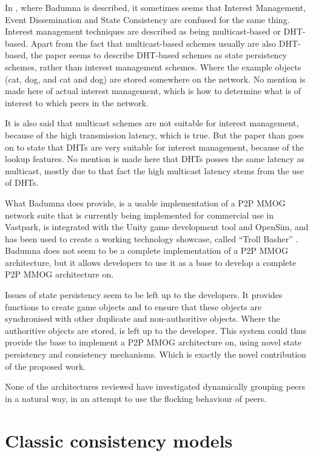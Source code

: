\documentclass[journal,oneside,a4paper,onecolumn]{IEEEtran}
\begin{document}
In \cite{badumna_engine}, where Badumna is described, it sometimes seems that Interest Management, Event Dissemination and State Consistency are confused for the same thing. Interest management techniques are described as being multicast-based or DHT-based. Apart from the fact that multicast-based schemes usually are also DHT-based, the paper seems to describe DHT-based schemes as state persistency schemes, rather than interest management schemes. Where the example objects (cat, dog, and cat and dog) are stored somewhere on the network. No mention is made here of actual interest management, which is how to determine what is of interest to which peers in the network.

It is also said that multicast schemes are not suitable for interest management, because of the high transmission latency, which is true. But the paper than goes on to state that DHTs are very suitable for interest management, because of the lookup features. No mention is made here that DHTs posses the same latency as multicast, mostly due to that fact the high multicast latency stems from the use of DHTs.

What Badumna does provide, is a usable implementation of a P2P MMOG network suite that is currently being implemented for commercial use in Vastpark, is integrated with the Unity game development tool and OpenSim, and has been used to create a working technology showcase, called ``Troll Basher'' \cite{badumna_showcase}. Badumna does not seem to be a complete implementation of a P2P MMOG architecture, but it allows developers to use it as a base to develop a complete P2P MMOG architecture on.

Issues of state persistency seem to be left up to the developers. It provides functions to create game objects and to ensure that these objects are synchronised with other duplicate and non-authoritive objects. Where the authoritive objects are stored, is left up to the developer. This system could thus provide the base to implement a P2P MMOG architecture on, using novel state persistency and consistency mechanisms. Which is exactly the novel contribution of the proposed work.

None of the architectures reviewed have investigated dynamically grouping peers in a natural way, in an attempt to use the flocking behaviour of peers.



\section{Classic consistency models}
\label{consistency_models}
\end{document}
